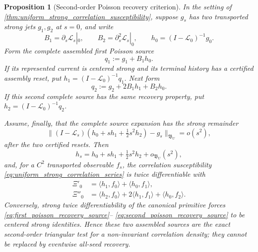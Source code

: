 \documentclass[11pt]{amsart}
\theoremstyle{compactplain}
\newtheorem{proposition}[theorem]{Proposition}
\theoremstyle{compactdefinition}
\theoremstyle{compactremark}
\newcommand{\Ltransfer}{\mathscr L}
\begin{document}
\begin{proposition}[Second-order Poisson recovery criterion]
\label{prop:second_order_poisson_recovery_criterion}
In the setting of
\cref{thm:uniform_strong_correlation_susceptibility}, suppose \(g_s\) has two
transported strong jets \(g_1,g_2\) at \(s=0\), and write
\[
 B_1=\partial_s\Ltransfer_s|_0,
 \qquad B_2=\partial_s^2\Ltransfer_s|_0,
 \qquad h_0=(I-\Ltransfer_0)^{-1}g_0.
\]
Form the \emph{complete assembled} first Poisson source
\begin{equation}
\label{eq:first_poisson_recovery_source}
 q_1:=g_1+B_1h_0.
\end{equation}
If its represented current is centered strong and its terminal history has a
certified assembly reset, put
\(h_1=(I-\Ltransfer_0)^{-1}q_1\).  Next form
\begin{equation}
\label{eq:second_poisson_recovery_source}
 q_2:=g_2+2B_1h_1+B_2h_0.
\end{equation}
If this second complete source has the same recovery property, put
\(h_2=(I-\Ltransfer_0)^{-1}q_2\).

Assume, finally, that the complete source expansion has the strong remainder
\begin{equation}
\label{eq:poisson_second_order_remainder}
 \bigl\|(I-\Ltransfer_s)
   (h_0+sh_1+\tfrac12s^2h_2)-g_s\bigr\|_{\mathfrak B_U}
 =o(s^2),
\end{equation}
after the two certified resets.  Then
\begin{equation}
\label{eq:poisson_primitive_second_order_expansion}
 h_s=h_0+sh_1+\tfrac12s^2h_2+o_{\mathfrak B_U}(s^2),
\end{equation}
and, for a \(C^2\) transported observable \(f_s\), the correlation
susceptibility \eqref{eq:uniform_strong_correlation_series} is twice
differentiable with
\begin{align*}
 \Xi'_0&=\langle h_1,f_0\rangle+\langle h_0,f_1\rangle,\\
 \Xi''_0&=\langle h_2,f_0\rangle
          +2\langle h_1,f_1\rangle+\langle h_0,f_2\rangle.
\end{align*}
Conversely, strong twice differentiability of the canonical primitive forces
\eqref{eq:first_poisson_recovery_source}--
\eqref{eq:second_poisson_recovery_source} to be centered strong identities.
Hence these two assembled sources are the exact second-order triangular test
for a non-invariant correlation density; they cannot be replaced by
eventwise all-seed recovery.
\end{proposition}
\end{document}
